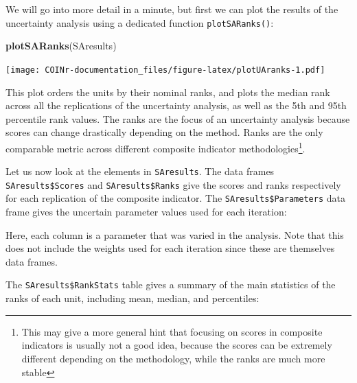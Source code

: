 \documentclass[
]{book}
\newenvironment{Shaded}{\begin{snugshade}}{\end{snugshade}}
\newcommand{\CommentTok}[1]{\textcolor[rgb]{0.56,0.35,0.01}{\textit{#1}}}
\newcommand{\KeywordTok}[1]{\textcolor[rgb]{0.13,0.29,0.53}{\textbf{#1}}}
\newcommand{\NormalTok}[1]{#1}
\newcommand{\OperatorTok}[1]{\textcolor[rgb]{0.81,0.36,0.00}{\textbf{#1}}}
\begin{document}
We will go into more detail in a minute, but first we can plot the results of the uncertainty analysis using a dedicated function \texttt{plotSARanks()}:

\begin{Shaded}
\begin{Highlighting}[]
\KeywordTok{plotSARanks}\NormalTok{(SAresults)}
\end{Highlighting}
\end{Shaded}

\texttt{[image: COINr-documentation\_files/figure-latex/plotUAranks-1.pdf]}

This plot orders the units by their nominal ranks, and plots the median rank across all the replications of the uncertainty analysis, as well as the 5th and 95th percentile rank values. The ranks are the focus of an uncertainty analysis because scores can change drastically depending on the method. Ranks are the only comparable metric across different composite indicator methodologies\footnote{This may give a more general hint that focusing on scores in composite indicators is usually not a good idea, because the scores can be extremely different depending on the methodology, while the ranks are much more stable}.

Let us now look at the elements in \texttt{SAresults}. The data frames \texttt{SAresults\$Scores} and \texttt{SAresults\$Ranks} give the scores and ranks respectively for each replication of the composite indicator. The \texttt{SAresults\$Parameters} data frame gives the uncertain parameter values used for each iteration:

\begin{Shaded}
\end{Shaded}

Here, each column is a parameter that was varied in the analysis. Note that this does not include the weights used for each iteration since these are themselves data frames.

The \texttt{SAresults\$RankStats} table gives a summary of the main statistics of the ranks of each unit, including mean, median, and percentiles:
\end{document}
